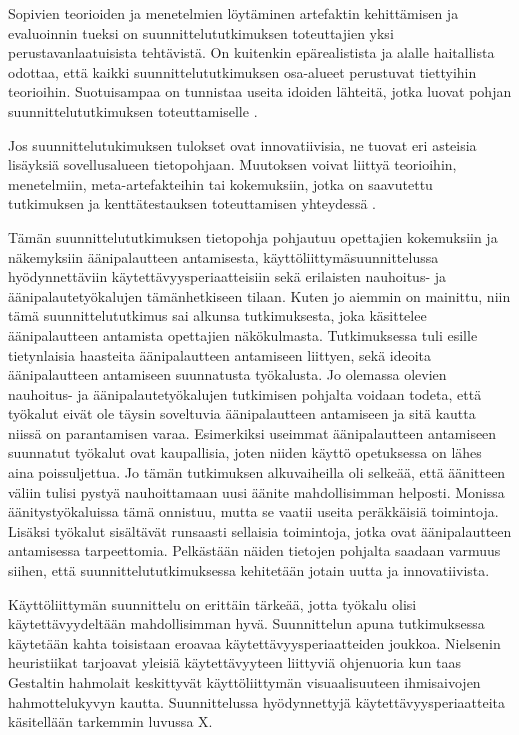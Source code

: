 \documentclass[utf8]{gradu3}
\begin{document}
Sopivien teorioiden ja menetelmien löytäminen artefaktin kehittämisen ja evaluoinnin tueksi on suunnittelututkimuksen toteuttajien yksi perustavanlaatuisista tehtävistä. On kuitenkin epärealistista ja alalle haitallista odottaa, että kaikki suunnittelututkimuksen osa-alueet perustuvat tiettyihin teorioihin. Suotuisampaa on tunnistaa useita idoiden lähteitä, jotka luovat pohjan suunnittelututkimuksen toteuttamiselle \parencite[][]{cycles}.

Jos suunnittelutukimuksen tulokset ovat innovatiivisia, ne tuovat eri asteisia lisäyksiä sovellusalueen tietopohjaan. Muutoksen voivat liittyä teorioihin, menetelmiin, meta-artefakteihin tai kokemuksiin, jotka on saavutettu tutkimuksen ja kenttätestauksen toteuttamisen yhteydessä \parencite[][]{cycles}.

Tämän suunnittelututkimuksen tietopohja pohjautuu opettajien kokemuksiin ja näkemyksiin äänipalautteen antamisesta, käyttöliittymäsuunnittelussa hyödynnettäviin käytettävyysperiaatteisiin sekä erilaisten nauhoitus- ja äänipalautetyökalujen tämänhetkiseen tilaan.  Kuten jo aiemmin on mainittu, niin tämä suunnittelututkimus sai alkunsa tutkimuksesta, joka käsittelee äänipalautteen antamista opettajien näkökulmasta. Tutkimuksessa tuli esille tietynlaisia haasteita äänipalautteen antamiseen liittyen, sekä ideoita äänipalautteen antamiseen suunnatusta työkalusta. Jo olemassa olevien nauhoitus- ja äänipalautetyökalujen tutkimisen pohjalta voidaan todeta, että työkalut eivät ole täysin soveltuvia äänipalautteen antamiseen ja sitä kautta niissä on parantamisen varaa. Esimerkiksi useimmat äänipalautteen antamiseen suunnatut työkalut ovat kaupallisia, joten niiden käyttö opetuksessa on lähes aina poissuljettua. Jo tämän tutkimuksen alkuvaiheilla oli selkeää, että äänitteen väliin tulisi pystyä nauhoittamaan uusi äänite mahdollisimman helposti. Monissa äänitystyökaluissa tämä onnistuu, mutta se vaatii useita peräkkäisiä toimintoja. Lisäksi työkalut sisältävät runsaasti sellaisia toimintoja, jotka ovat äänipalautteen antamisessa tarpeettomia. Pelkästään näiden tietojen pohjalta saadaan varmuus siihen, että suunnittelututkimuksessa kehitetään jotain uutta ja innovatiivista.

Käyttöliittymän suunnittelu on erittäin tärkeää, jotta työkalu olisi käytettävyydeltään mahdollisimman hyvä. Suunnittelun apuna tutkimuksessa käytetään kahta toisistaan eroavaa käytettävyysperiaatteiden joukkoa. Nielsenin heuristiikat tarjoavat yleisiä käytettävyyteen liittyviä ohjenuoria kun taas Gestaltin hahmolait keskittyvät käyttöliittymän visuaalisuuteen ihmisaivojen hahmottelukyvyn kautta. Suunnittelussa hyödynnettyjä käytettävyysperiaatteita käsitellään tarkemmin luvussa X.
\end{document}
